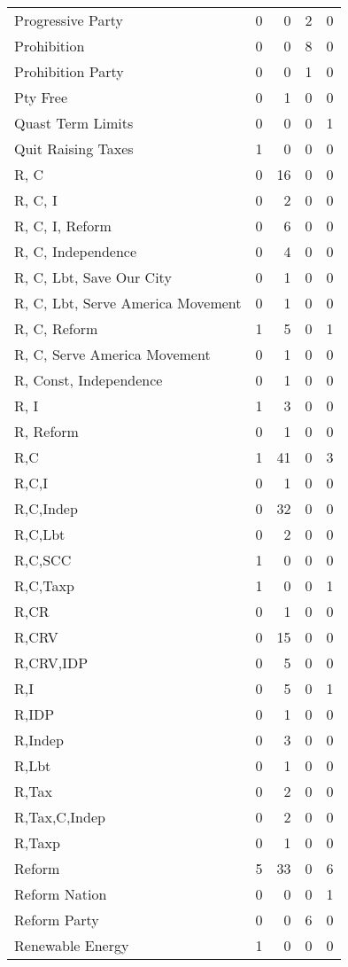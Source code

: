 \begin{supertabular}{lrrrr}
Progressive Party & 0 & 0 & 2 & 0\\
Prohibition & 0 & 0 & 8 & 0\\
Prohibition Party & 0 & 0 & 1 & 0\\
Pty Free & 0 & 1 & 0 & 0\\
Quast Term Limits & 0 & 0 & 0 & 1\\
Quit Raising Taxes & 1 & 0 & 0 & 0\\
R, C & 0 & 16 & 0 & 0\\
R, C, I & 0 & 2 & 0 & 0\\
R, C, I, Reform & 0 & 6 & 0 & 0\\
R, C, Independence & 0 & 4 & 0 & 0\\
R, C, Lbt, Save Our City & 0 & 1 & 0 & 0\\
R, C, Lbt, Serve America Movement & 0 & 1 & 0 & 0\\
R, C, Reform & 1 & 5 & 0 & 1\\
R, C, Serve America Movement & 0 & 1 & 0 & 0\\
R, Const, Independence & 0 & 1 & 0 & 0\\
R, I & 1 & 3 & 0 & 0\\
R, Reform & 0 & 1 & 0 & 0\\
R,C & 1 & 41 & 0 & 3\\
R,C,I & 0 & 1 & 0 & 0\\
R,C,Indep & 0 & 32 & 0 & 0\\
R,C,Lbt & 0 & 2 & 0 & 0\\
R,C,SCC & 1 & 0 & 0 & 0\\
R,C,Taxp & 1 & 0 & 0 & 1\\
R,CR & 0 & 1 & 0 & 0\\
R,CRV & 0 & 15 & 0 & 0\\
R,CRV,IDP & 0 & 5 & 0 & 0\\
R,I & 0 & 5 & 0 & 1\\
R,IDP & 0 & 1 & 0 & 0\\
R,Indep & 0 & 3 & 0 & 0\\
R,Lbt & 0 & 1 & 0 & 0\\
R,Tax & 0 & 2 & 0 & 0\\
R,Tax,C,Indep & 0 & 2 & 0 & 0\\
R,Taxp & 0 & 1 & 0 & 0\\
Reform & 5 & 33 & 0 & 6\\
Reform Nation & 0 & 0 & 0 & 1\\
Reform Party & 0 & 0 & 6 & 0\\
Renewable Energy & 1 & 0 & 0 & 0\\

\end{supertabular}

